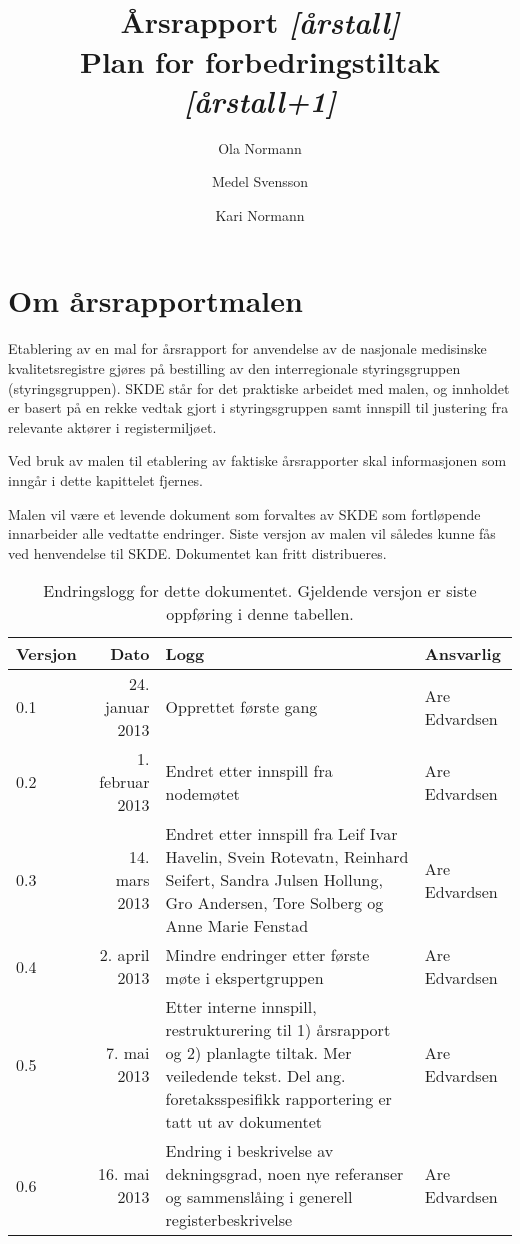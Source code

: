 \documentclass[norsk, a4paper, twocolumn]{report}
\title{\registernavn \\ \textbf{Årsrapport \textit{[årstall]}\\
Plan for forbedringstiltak \textit{[årstall+1]}}}
\author[1]{Ola Normann}
\author[2]{Medel Svensson}
\author[1]{Kari Normann}
\affil[1]{et Sykehus, et Foretak, et Sted}
\affil[2]{en annen adresse, et annet Sted}
\begin{document}
\maketitle


\onecolumn


\chapter*{Om årsrapportmalen}
Etablering av en mal for årsrapport for anvendelse av de nasjonale medisinske
kvalitetsregistre gjøres på bestilling av den interregionale styringsgruppen
(styringsgruppen).
SKDE står for det praktiske arbeidet med malen, og innholdet er basert på
en rekke vedtak gjort i styringsgruppen samt innspill til justering fra
relevante aktører i registermiljøet.

Ved bruk av malen til etablering av faktiske årsrapporter skal informasjonen
som inngår i dette kapittelet fjernes.

Malen vil være et levende dokument som
forvaltes av SKDE som fortløpende innarbeider alle vedtatte endringer. Siste
versjon av malen vil således kunne fås ved henvendelse til SKDE. Dokumentet
kan fritt distribueres.

\begin{table}[ht]
  \centering
  \begin{tabular}{lrp{8cm}l}
    \hline
    Versjon & Dato & Logg & Ansvarlig \\
    \hline
    0.1 & 24. januar 2013 & Opprettet første gang & Are Edvardsen \\
    0.2 & 1. februar 2013 & Endret etter innspill fra nodemøtet &
    Are Edvardsen \\
    0.3 & 14. mars 2013 & Endret etter innspill fra Leif Ivar Havelin,
    Svein Rotevatn,
    Reinhard Seifert, Sandra Julsen Hollung, Gro Andersen, Tore Solberg og
    Anne Marie Fenstad & Are Edvardsen \\
    0.4 & 2. april 2013 & Mindre endringer etter første møte i ekspertgruppen &
    Are Edvardsen \\
    0.5 & 7. mai 2013 & Etter interne innspill, restrukturering til 1)
    årsrapport og 2) planlagte tiltak. Mer veiledende tekst. Del ang.
    foretaksspesifikk rapportering er tatt ut av dokumentet & Are Edvardsen \\
    0.6 & 16. mai 2013 & Endring i beskrivelse av
    dekningsgrad, noen nye referanser og sammenslåing i generell
    registerbeskrivelse & Are Edvardsen \\
    \hline
  \end{tabular}
  \caption{Endringslogg for dette dokumentet. Gjeldende versjon er siste
  oppføring i denne tabellen.}
  \label{tab:log}
\end{table}
\end{document}

